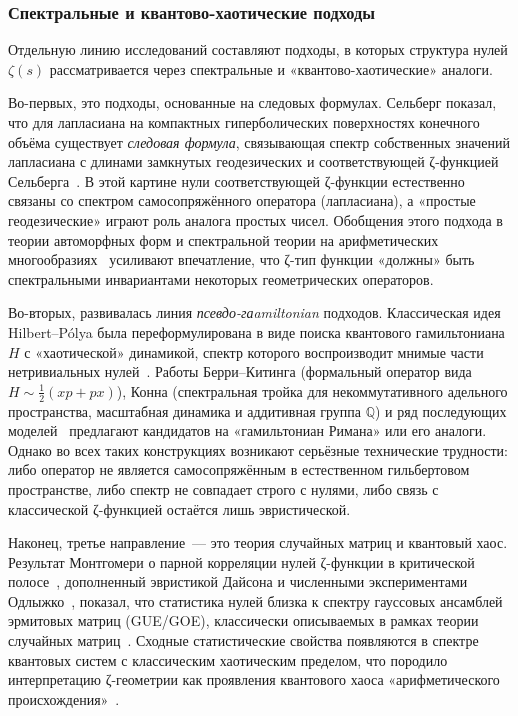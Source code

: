 \documentclass{article}
\numberwithin{equation}{section}
\theoremstyle{plain}
\theoremstyle{definition}
\theoremstyle{remark}
\begin{document}
\subsubsection{Спектральные и квантово-хаотические подходы}
\label{subsubsec:spectral-quantum-chaotic}

\noindent
Отдельную линию исследований составляют подходы, в которых структура нулей $\zeta(s)$ рассматривается через спектральные и «квантово-хаотические» аналоги.

\medskip

\noindent
Во-первых, это подходы, основанные на следовых формулах. 
Сельберг показал, что для лапласиана на компактных гиперболических поверхностях конечного объёма существует \emph{следовая формула}, связывающая спектр собственных значений лапласиана с длинами замкнутых геодезических и соответствующей ζ-функцией Сельберга~\cite{Selberg1956,Hejhal1983}. 
В этой картине нули соответствующей ζ-функции естественно связаны со спектром самосопряжённого оператора (лапласиана), а «простые геодезические» играют роль аналога простых чисел. 
Обобщения этого подхода в теории автоморфных форм и спектральной теории на арифметических многообразиях~\cite{IwaniecKowalski2004} усиливают впечатление, что ζ-тип функции «должны» быть спектральными инвариантами некоторых геометрических операторов.

\medskip

\noindent
Во-вторых, развивалась линия \emph{псевдо-гаamiltonian} подходов.
Классическая идея Hilbert--Pólya была переформулирована в виде поиска квантового гамильтониана $H$ с «хаотической» динамикой, спектр которого воспроизводит мнимые части нетривиальных нулей~\cite{BerryKeating1999}. 
Работы Берри--Китинга (формальный оператор вида $H\sim \tfrac12(xp+px)$), Конна (спектральная тройка для некоммутативного адельного пространства, масштабная динамика и аддитивная группа $\mathbb Q$) и ряд последующих моделей~\cite{Connes1999,ConnesMarcolli2008,SierraTownsend2008} предлагают кандидатов на «гамильтониан Римана» или его аналоги.
Однако во всех таких конструкциях возникают серьёзные технические трудности:
либо оператор не является самосопряжённым в естественном гильбертовом пространстве, либо спектр не совпадает строго с нулями, либо связь с классической ζ-функцией остаётся лишь эвристической.

\medskip

\noindent
Наконец, третье направление~--- это теория случайных матриц и квантовый хаос. 
Результат Монтгомери о парной корреляции нулей ζ-функции в критической полосе~\cite{Montgomery1973}, дополненный эвристикой Дайсона и численными экспериментами Одлыжко~\cite{Dyson1962,Odlyzko1987}, показал, что статистика нулей близка к спектру гауссовых ансамблей эрмитовых матриц (GUE/GOE), классически описываемых в рамках теории случайных матриц~\cite{Mehta2004}. 
Сходные статистические свойства появляются в спектре квантовых систем с классическим хаотическим пределом, что породило интерпретацию ζ-геометрии как проявления квантового хаоса «арифметического происхождения»~\cite{Berry1986,Haake2010}.
\end{document}
